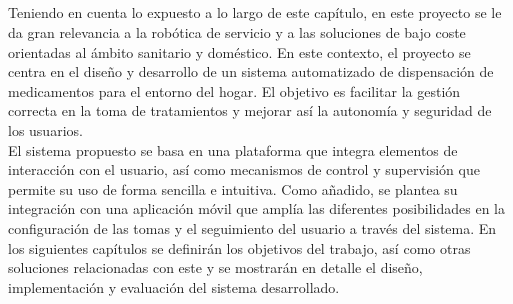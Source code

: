 \

\

\

\

Teniendo en cuenta lo expuesto a lo largo de este capítulo, en este proyecto se le da gran relevancia a la robótica de servicio y a las soluciones de bajo coste orientadas al ámbito sanitario y doméstico. En este contexto, el proyecto se centra en el diseño y desarrollo de un sistema automatizado de dispensación de medicamentos para el entorno del hogar. El objetivo es facilitar la gestión correcta en la toma de tratamientos y mejorar así la autonomía y seguridad de los usuarios.\\

El sistema propuesto se basa en una plataforma que integra elementos de interacción con el usuario, así como mecanismos de control y supervisión que permite su uso de forma sencilla e intuitiva. Como añadido, se plantea su integración con una aplicación móvil que amplía las diferentes posibilidades en la configuración de las tomas y el seguimiento del usuario a través del sistema. En los siguientes capítulos se definirán los objetivos del trabajo, así como otras soluciones relacionadas con este y se mostrarán en detalle el diseño, implementación y evaluación del sistema desarrollado.
